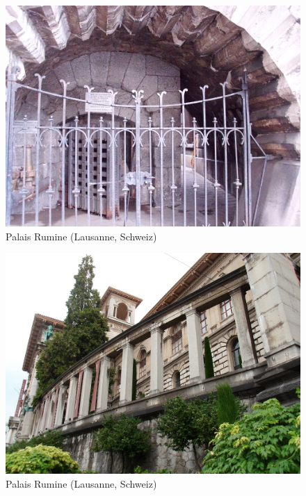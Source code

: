 \documentclass[a4paper,
fontsize=11pt,
oneside,
numbers=noperiodatend,
parskip=half-,
bibliography=totoc,
final
]{scrartcl}
\begin{document}
\begin{figure}[htbp]
\centering
\includegraphics{./img/016.jpg}
\caption{Palais Rumine (Lausanne,
Schweiz)}
\end{figure}

\begin{figure}[htbp]
\centering
\includegraphics{./img/017.jpg}
\caption{Palais Rumine (Lausanne,
Schweiz)}
\end{figure}
\end{document}
